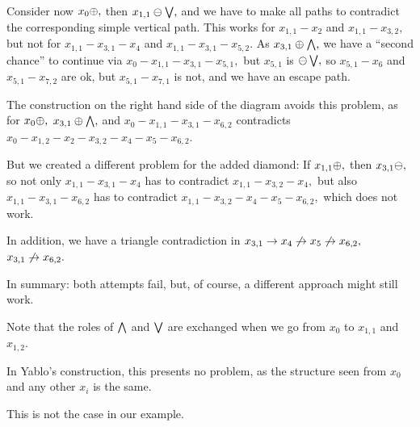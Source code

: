 Consider now $x_{0} \oplus,$ then $x_{1,1} \ominus \bigvee,$ and we have to make
all paths
to contradict the corresponding simple vertical path.
This works for $x_{1,1}-x_{2}$ and $x_{1,1}-x_{3,2},$ but not for
$x_{1,1}-x_{3,1}-x_{4}$ and
$x_{1,1}-x_{3,1}-x_{5,2}.$
As $x_{3,1} \oplus \bigwedge,$ we have a ``second chance'' to continue via
$x_{0}-x_{1,1}-x_{3,1}-x_{5,1},$ but $x_{5,1}$ is $ \ominus \bigvee,$ so
$x_{5,1}-x_{6}$ and $x_{5,1}-x_{7,2}$ are ok,
but $x_{5,1}-x_{7,1}$ is not, and we have an escape path.

 \xDH
The construction on the right hand side of the diagram avoids this
problem,
as for $x_{0} \oplus,$ $x_{3,1} \oplus \bigwedge,$ and
$x_{0}-x_{1,1}-x_{3,1}-x_{6,2}$ contradicts
$x_{0}-x_{1,2}-x_{2}-x_{3,2}-x_{4}-x_{5}-x_{6,2}.$

But we created a different problem for the added diamond:
If $x_{1,1} \oplus,$ then $x_{3,1} \ominus,$ so not only
$x_{1,1}-x_{3,1}-x_{4}$ has to contradict $x_{1,1}-x_{3,2}-x_{4},$ but
also
$x_{1,1}-x_{3,1}-x_{6,2}$ has to contradict
$x_{1,1}-x_{3,2}-x_{4}-x_{5}-x_{6,2},$
which does not work.

In addition, we have a triangle contradiction in $x_{3,1} \rightarrow x_{4} \not\rightarrow
x_{5} \not\rightarrow x_{6,2},$ $x_{3,1} \not\rightarrow x_{6,2}.$

In summary: both attempts fail, but, of course, a different approach
might still work.

 \xDH
Note that the roles of $ \bigwedge $ and $ \bigvee $ are exchanged when we go from
$x_{0}$ to
$x_{1,1}$ and $x_{1,2}.$

In Yablo's construction, this presents no problem, as the structure seen
from
$x_{0}$ and any other $x_{i}$ is the same.

This is not the case in our example.

 \xEj


\clearpage


